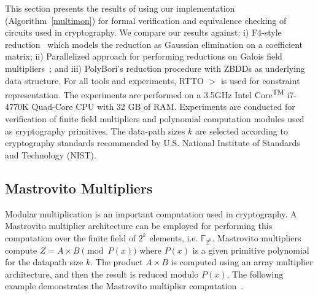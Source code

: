 
This section presents the results of using our implementation
(Algorithm~\ref{multimon}) for formal verification and equivalence
checking of circuits used in cryptography. We compare our results
against: i) F4-style reduction~\cite{pruss:tcad} which models the
reduction as Gaussian elimination on a coefficient matrix;   ii)
Parallelized approach for performing reductions on Galois field 
multipliers~\cite{cunxi:aspdac17};  and iii) PolyBori's \cite{polybori:2009}
reduction procedure with ZBDDs as
underlying data structure. For all tools and experiments, RTTO $>$ is
used for constraint representation. 
 The experiments are performed on a 3.5GHz
Intel Core\textsuperscript{TM} i7-4770K Quad-Core CPU with 32 GB of
RAM. Experiments are conducted for verification of finite field
multipliers and polynomial computation modules used as cryptography
primitives. The data-path sizes {$k$} are selected according to
cryptography standards recommended by U.S. National Institute of
Standards and Technology (NIST). 

\subsection{Mastrovito Multipliers}

Modular multiplication is an important computation used in
cryptography. A Mastrovito multiplier architecture can be employed for
performing this computation over the finite field of $2^k$ elements,
i.e. $\mathbb{F}_{2^k}$. Mastrovito multipliers compute $Z = A\times B \pmod{
  P(x)}$ where $P(x)$ is a given primitive polynomial for the datapath size
$k$. The product $A \times B$ is computed using an array multiplier
architecture, and then the result is reduced modulo $P(x)$. The
following example demonstrates the Mastrovito multiplier
computation~\cite{lv:tcad2013}. 



